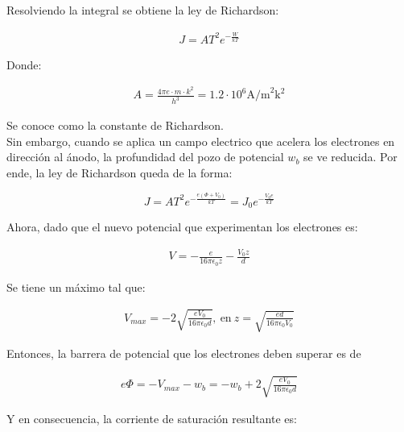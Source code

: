 \documentclass[%
 reprint,
 amsmath,amssymb,
 aps,
]{revtex4-2}
\begin{document}
\vspace{0.2 cm}
Resolviendo la integral se obtiene la ley de Richardson:

\begin{align*}
    J = AT^{2}e^{-\frac{W}{kT}}
\end{align*}

\vspace{0.2 cm}
Donde:

\begin{align*}
    A = \frac{4\pi e\cdot m \cdot k^{2}}{h^{3}} = 1.2\cdot 10^{6} \text{A/m}^{2}\text{k}^{2}
\end{align*}

\vspace{0.2 cm}
 Se conoce como la constante de Richardson.
\\

Sin embargo, cuando se aplica un campo electrico que acelera los electrones en dirección al ánodo, la profundidad del pozo de potencial $w_b$ se ve reducida. Por ende, la ley de Richardson queda de la forma:

\begin{equation}
    J=AT^2e^{-\frac{e(\Phi + V_0)}{kT}}=J_0e^{-\frac{V_0e}{kT}}
    \label{eq: Ley de Richardson}
\end{equation}

\vspace{0.2 cm}
Ahora, dado que el nuevo potencial que experimentan los electrones es:

\begin{align*}
    V=-\frac{e}{16\pi \epsilon_0 z}-\frac{V_0z}{d}
\end{align*}

\vspace{0.2 cm}
Se tiene un máximo tal que:

\begin{align*}
    V_{max}=-2\sqrt{\frac{eV_0}{16\pi \epsilon_0 d}},\ \text{en}\ z=\sqrt{\frac{ed}{16\pi \epsilon_0 V_0}}
\end{align*}

Entonces, la barrera de potencial que los electrones deben superar es de

\begin{align*}
    e\Phi=-V_{max}-w_b=-w_b+2\sqrt{\frac{eV_0}{16\pi \epsilon_0 d}}
\end{align*}

\vspace{0.2 cm}
Y en consecuencia, la corriente de saturación resultante es:
\end{document}

